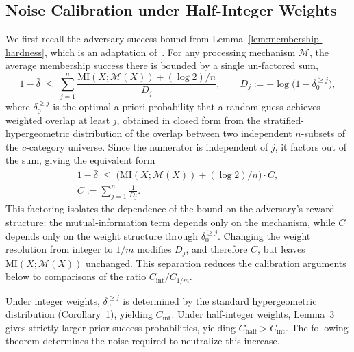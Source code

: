 \documentclass[sigconf,anonymous, review]{acmart}
\newcommand{\MI}{\mathrm{MI}}
\begin{document}
\subsection{Noise Calibration under Half-Integer Weights}

We first recall the adversary success bound from Lemma~\ref{lem:membership-hardness}, which is an adaptation of~\cite[Corollary~1]{xiao2024formal}. For any processing mechanism $\mathcal{M}$, the average membership success there is bounded by a single un-factored sum,
\[
1 - \bar{\delta}
\;\le\;
\sum_{j=1}^{n}
\frac{\MI(X;\mathcal{M}(X)) + (\log 2)/n}{D_j},
\qquad
D_j := -\log\!\big(1-\delta_0^{\ge j}\big),
\]
where $\delta_0^{\ge j}$ is the optimal a priori probability that a random guess achieves weighted overlap at least $j$, obtained in closed form from the stratified-hypergeometric distribution of the overlap between two independent $n$-subsets of the $c$-category universe. Since the numerator is independent of $j$, it factors out of the sum, giving the equivalent form
\begin{equation}
\label{eq:success_bound_recall}
\begin{gathered}
1 - \bar{\delta}
\;\le\;
\big(\MI(X;\mathcal{M}(X)) + (\log 2)/n\big)\cdot C, \\
C := \sum_{j=1}^{n} \frac{1}{D_j}.
\end{gathered}
\end{equation}
This factoring isolates the dependence of the bound on the adversary's reward structure: the mutual-information term depends only on the mechanism, while $C$ depends only on the weight structure through $\delta_0^{\ge j}$. Changing the weight resolution from integer to $1/m$ modifies $D_j$, and therefore $C$, but leaves $\MI(X;\mathcal{M}(X))$ unchanged. This separation reduces the calibration arguments below to comparisons of the ratio $C_{\mathrm{int}}/C_{1/m}$.

Under integer weights, $\delta_0^{\ge j}$ is determined by the standard hypergeometric distribution (Corollary~1), yielding $C_{\mathrm{int}}$. Under half-integer weights, Lemma~3 gives strictly larger prior success probabilities, yielding $C_{\mathrm{half}} > C_{\mathrm{int}}$. The following theorem determines the noise required to neutralize this increase.
\end{document}
